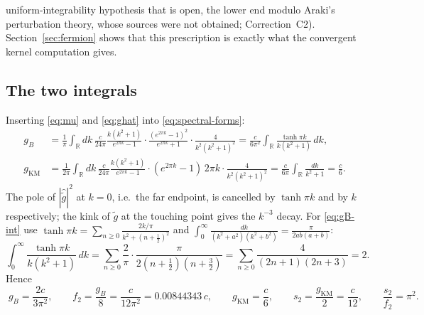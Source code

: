 \documentclass[11pt]{article}
\theoremstyle{accent}
\theoremstyle{definition}
\newcommand{\gh}{\widehat{\widetilde g}}
\newcommand{\gt}{\widetilde g}
\begin{document}
uniform-integrability hypothesis that is open, the lower end modulo Araki's perturbation theory, whose sources were not obtained; Correction~C2).  Section~\ref{sec:fermion} shows that this prescription is exactly what the convergent kernel computation gives.

\subsection{The two integrals}
Inserting \eqref{eq:mu} and \eqref{eq:ghat} into \eqref{eq:spectral-forms}:
\begin{align}
 g_B&=\frac{1}{\pi}\int_{\mathbb R}dk\,\frac{c}{24\pi}\frac{k(k^2+1)}{e^{2\pi k}-1}\cdot\frac{(e^{2\pi k}-1)^2}{e^{2\pi k}+1}\cdot\frac{4}{k^2(k^2+1)^2}
 =\frac{c}{6\pi^2}\int_{\mathbb R}\frac{\tanh\pi k}{k(k^2+1)}\,dk,\label{eq:gB-int}\\
 g_{\mathrm{KM}}&=\frac1{2\pi}\int_{\mathbb R}dk\,\frac{c}{24\pi}\frac{k(k^2+1)}{e^{2\pi k}-1}\cdot(e^{2\pi k}-1)\,2\pi k\cdot\frac{4}{k^2(k^2+1)^2}
 =\frac{c}{6\pi}\int_{\mathbb R}\frac{dk}{k^2+1}=\frac c6.\label{eq:gKM-int}
\end{align}
The pole of \(|\gh|^2\) at \(k=0\), i.e.\ the far endpoint, is cancelled by \(\tanh\pi k\) and by \(k\) respectively; the kink of \(\gt\) at the touching point gives the \(k^{-3}\) decay.  For \eqref{eq:gB-int} use \(\tanh\pi k=\sum_{n\ge0}\frac{2k/\pi}{k^2+(n+\frac12)^2}\) and \(\int_0^\infty\frac{dk}{(k^2+a^2)(k^2+b^2)}=\frac{\pi}{2ab(a+b)}\):
\begin{equation}\label{eq:key-integral}
 \int_0^\infty\frac{\tanh\pi k}{k(k^2+1)}\,dk=\sum_{n\ge0}\frac{2}{\pi}\cdot\frac{\pi}{2(n+\frac12)(n+\frac32)}=\sum_{n\ge0}\frac{4}{(2n+1)(2n+3)}=2 .
\end{equation}
Hence
\begin{equation}\label{eq:result-general}
 \boxed{\;g_B=\frac{2c}{3\pi^2},\qquad f_2=\frac{g_B}{8}=\frac{c}{12\pi^2}=0.00844343\,c,\qquad g_{\mathrm{KM}}=\frac c6,\qquad s_2=\frac{g_{\mathrm{KM}}}{2}=\frac c{12},\qquad \frac{s_2}{f_2}=\pi^2.\;}
\end{equation}
\end{document}
